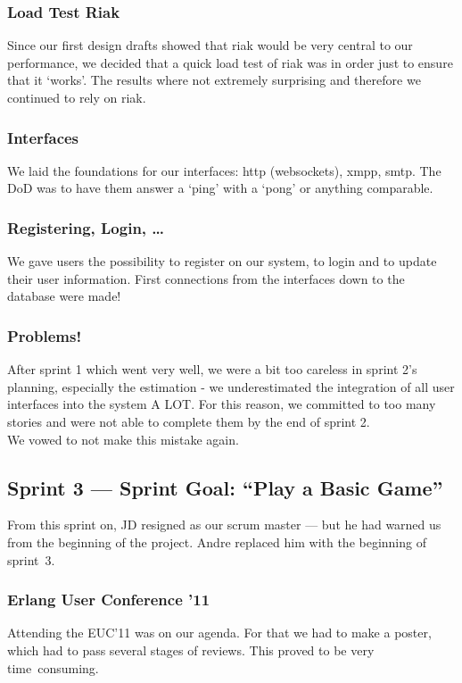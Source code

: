 \documentclass[11pt,a4paper]{report}
\begin{document}
\subsubsection{Load Test Riak}
Since our first design drafts showed that riak would be very central to our
performance, we decided that a quick load test of riak was in order just to
ensure that it `works'. The results where not extremely surprising and therefore
we continued to rely on riak.

\subsubsection{Interfaces}
We laid the foundations for our interfaces: http (websockets), xmpp, smtp.
The DoD was to have them answer a `ping' with a `pong' or anything comparable.

\subsubsection{Registering, Login, \ldots}
We gave users the possibility to register on our system, to login and to update
their user information. First connections from the interfaces down to the
database were made!

\subsubsection{Problems!}
After sprint 1 which went very well, we were a bit too careless in sprint 2's
planning, especially the estimation - we underestimated the integration of
all user interfaces into the system A LOT.
For this reason, we committed to too many stories and were not able to complete
them by the end of sprint 2. \\
We vowed to not make this mistake again.

\subsection*{Sprint 3 --- Sprint Goal: ``Play a Basic Game''}
From this sprint on, JD resigned as our scrum master --- but he had warned us
from the beginning of the project. Andre replaced him with the beginning of
sprint~3.

\subsubsection{Erlang User Conference '11}

Attending the EUC'11 was on our agenda. For that we had to make a
poster, which had to pass several stages of reviews. This proved to be very
time~consuming.
\end{document}
